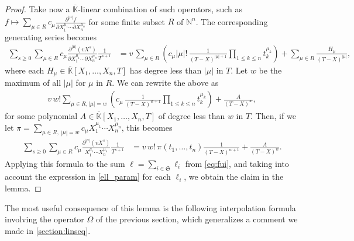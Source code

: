 \documentclass[12pt]{article}
\newcommand{\lf}{X}
\def\N {\ensuremath{\mathbb{N}}}
\def\Kbar {{\ensuremath{\overline{\mathbb{K}}}}}
\begin{document}
\begin{proof}
  Take now a $\Kbar$-linear combination of such operators, such as $f \mapsto
  \sum_{\mu \in R} c_\mu \frac{ \partial^{|\mu|} f } {\partial
    X_1^{\mu_1} \cdots \partial X_n^{\mu_n}}$ for some finite subset $R$ of
    $\N^n$. The corresponding generating series becomes
  \begin{align*}
    \sum_{s \ge 0} \sum_{\mu \in R} c_\mu \frac{ \partial^{|\mu|} ( v
      \lf^s )} {\partial X_1^{\mu_1} \cdots \partial X_n^{\mu_n}}
    \frac{1}{T^{s+1}} &= v\,\sum_{\mu \in R} \left( c_\mu |\mu|!\,  \frac {1}{(T-\lf )^{|\mu|+1}} \prod_{1
      \le k \le n} t_k^{\mu_k} \right )+\sum_{\mu
      \in R} \frac{H_\mu}{(T-\lf)^{|\mu|}},
  \end{align*}
  where each $H_\mu \in \Kbar[X_1,\dots,X_n,T]$ has degree less than
  $|\mu|$ in $T$.  Let $w$ be the maximum of all $|\mu|$ for $\mu$ in
  $R$. We can rewrite the above as
  \begin{align*}
    v\, w! 
    \sum_{\mu \in R, |\mu|=w}\left ( c_\mu
    \,    \frac {1}{(T-\lf )^{w+1}} \prod_{1 \le k \le n} 
    t_k^{\mu_k}\right )
	+ \frac{A}{(T-\lf )^{w}},
  \end{align*}
  for some polynomial $A \in \Kbar[X_1,\dots,X_n,T]$ of degree less than $w$ in $T$. 
  Then, if we let 
  $\pi =\sum_{\mu \in R,\ |\mu|=w} c_{\mu} X_1^{\mu_1} \cdots
  X_n^{\mu_n}$, this becomes
  \begin{align*}
    \sum_{s \ge 0} 
    \sum_{\mu \in R} c_\mu \frac{ \partial^{|\mu|} ( v \lf^s )} { X_1^{\mu_1} \cdots
      X_n^{\mu_n}}
    \frac{1}{T^{s+1}} 
    &=
    v\, w! \,  \pi(t_1,\dots,t_n)
    \frac {1}{(T-\lf )^{w+1}}
    + \frac{A}{(T-\lf )^{w}}.
  \end{align*}
  Applying this formula to the sum $\ell=\sum_{i \in
    \mathfrak{S}}\ell_i$ from \cref{eq:fui}, and taking into account
  the expression in \cref{ell_param} for each $\ell_i$, we obtain the
  claim in the lemma.
\end{proof}

\noindent 
The most useful consequence of this lemma is the following
interpolation formula involving the operator $\Omega$ of the previous
section, which generalizes a comment we made in \cref{section:linseq}.
\end{document}
